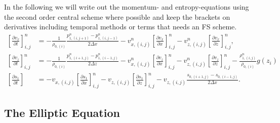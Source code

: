 In the following we will write out the momentum- and entropy-equations using the second order central scheme where possible and keep the brackets on derivatives including temporal methods or terms that needs an FS scheme.
\begin{align}
    \left[\frac{\partial v_x}{\partial t} \right]_{i,j}^n &= -\frac{1}{\rho_{0,(i)}}\frac{p_{1,(i,j+1)}^n - p_{1,(i,j-1)}^n}{2\Delta x} - v_{x,(i,j)}^n \left[\frac{\partial v_{x}}{\partial x}\right]_{i,j}^n - v_{z,(i,j)}^n \left[\frac{\partial v_{x}}{\partial z}\right]_{i,j}^n, \\
    \left[\frac{\partial v_z}{\partial t} \right]_{i,j}^n &= -\frac{1}{\rho_{0,(i)}}\frac{p_{1,(i+1,j)}^n - p_{1,(i-1,j)}^n}{2\Delta z} - v_{x,(i,j)}^n \left[\frac{\partial v_{z}}{\partial x}\right]_{i,j}^n - v_{z,(i,j)}^n \left[\frac{\partial v_{z}}{\partial z}\right]_{i,j}^n - \frac{\rho_{1,(i,j)}^n}{\rho_{0,(i)}}g(z_i)\\
    \left[\frac{\partial s_1}{\partial t}\right] &= - v_{x,(i,j)} \left[\frac{\partial s_1}{\partial x} \right]_{i,j}^n- v_{z,(i,j)} \left[\frac{\partial s_1}{\partial z} \right]_{i,j}^n - v_{z,(i,j)}\frac{s_{0,(i+1,j)}-s_{0,(i-1,j)}}{2\Delta x}. 
\end{align}

\subsection{The Elliptic Equation}

